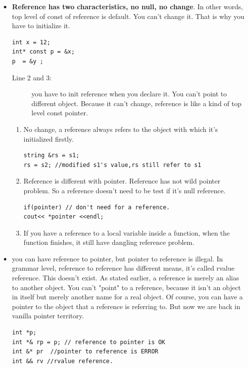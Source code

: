\documentclass[a4paper,11pt,twoside]{book}
\begin{document}
\begin{itemize}
\item \textbf{Reference has two characteristics, no null, no change}. In other words, top level of const of reference is default. You can't change it. That is why you have to initialize it.
\begin{lstlisting}
int x = 12;
int* const p = &x; 
p  = &y ; 
\end{lstlisting}
\begin{description}
	\item[Line 2 and 3:] you have to init reference when you declare it. You can't point to different object. Because it can't change, reference is like a kind of top level const pointer.
\end{description}

\begin{enumerate}
\item No change, a reference always refers to the object with which it's initialized firstly.
\begin{lstlisting}[numbers = none]
string &rs = s1;
rs = s2; //modified s1's value,rs still refer to s1
\end{lstlisting}

\item Reference is different with pointer. Reference has not wild pointer problem. So a reference doesn't need to be test if it's null reference.
\begin{lstlisting}[numbers=none]
if(pointer) // don't need for a reference.
cout<< *pointer <<endl;
\end{lstlisting}

\item If you have a reference to a local variable inside a function, when the function finishes, it still have dangling reference problem. 
\end{enumerate}

\item you can have reference to pointer, but pointer to reference is illegal. In grammar level, reference to reference has different means, it's called rvalue reference. This doesn't exist. As stated earlier, a reference is merely an alias to another object. You can't "point" to a reference, because it isn't an object in itself but merely another name for a real object. Of course, you can have a pointer to the object that a reference is referring to. But now we are back in vanilla pointer territory.
\begin{lstlisting}[numbers=none]
int *p;
int *& rp = p; // reference to pointer is OK
int &* pr  //pointer to reference is ERROR
int && rv //rvalue reference.
\end{lstlisting}



\end{itemize}
\end{document}
